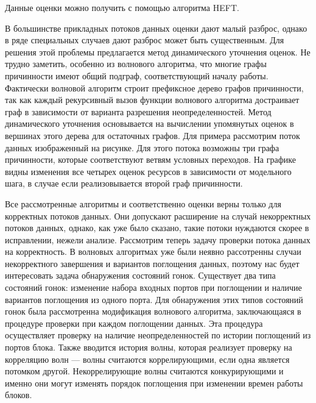 \documentclass[10pt,a4paper,onecolumn]{report}
\begin{document}
  Данные оценки можно получить с помощью алгоритма HEFT.
  
  В большинстве прикладных потоков данных оценки дают малый разброс, однако в ряде специальных случаев дают разброс может быть существенным.
  Для решения этой проблемы предлагается метод динамического уточнения оценок.
  Не трудно заметить, особенно из волнового алгоритма, что многие графы причинности имеют общий подграф, соответствующий началу работы.
  Фактически волновой алгоритм строит префиксное дерево графов причинности, так как каждый рекурсивный вызов функции волнового алгоритма достраивает граф в зависимости от
  варианта разрешения неопределенностей. Метод динамического уточнения основывается на вычислении упомянутых оценок в вершинах этого дерева для остаточных графов.
  Для примера рассмотрим поток данных изображенный на рисунке. Для этого потока возможны три графа причинности, которые соответствуют ветвям условных переходов.
  На графике видны изменения все четырех оценок ресурсов в зависимости от модельного шага, в случае если реализовывается второй граф причинности.
  
  Все рассмотренные алгоритмы и соответственно оценки верны только для корректных потоков данных. Они допускают расширение на случай некорректных потоков данных,
  однако, как уже было сказано, такие потоки нуждаются скорее в исправлении, нежели анализе.
  Рассмотрим теперь задачу проверки потока данных на корректность. В волновых алгоритмах уже были неявно рассотренны
  случаи некорректного завершения и вариантов поглощения данных, поэтому нас будет интересовать задача обнаружения состояний гонок.
  Существует два типа состояний гонок: изменение набора входных портов при поглощении и наличие вариантов поглощения из одного порта.
  Для обнаружения этих типов состояний гонок была рассмотренна модификация волнового алгоритма, заключающаяся в процедуре проверки при каждом поглощении данных.
  Эта процедура осуществляет проверку на наличие неопределенностей по истории поглощений из портов блока. Также вводится история волны, которая реализует проверку на корреляцию волн ---
  волны считаются коррелирующими, если одна является потомком другой. Некоррелирующие волны считаются конкурирующими и именно они могут изменять порядок поглощения
  при изменении времен работы блоков.
  
\end{document}
